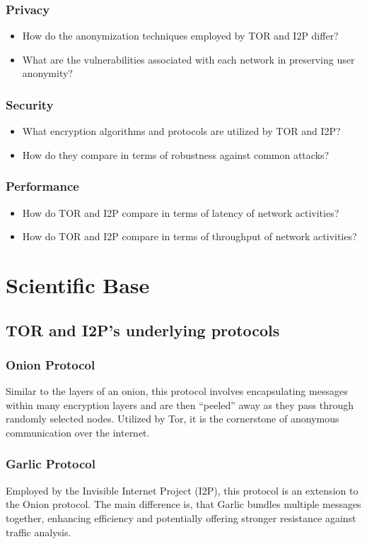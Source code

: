 \documentclass[12pt,conference]{IEEEtran}
\begin{document}
\subsubsection{Privacy}
\begin{itemize}
	\item How do the anonymization techniques employed by TOR and I2P differ?
	\item What are the vulnerabilities associated with each network in preserving user anonymity?
\end{itemize}
\subsubsection{Security} 
\begin{itemize}
	\item What encryption algorithms and protocols are utilized by TOR and I2P?
	\item How do they compare in terms of robustness against common attacks? 
\end{itemize}
\subsubsection{Performance} 
\begin{itemize}
	\item How do TOR and I2P compare in terms of latency of network activities?
	\item How do TOR and I2P compare in terms of throughput of network activities?
\end{itemize}

\section{Scientific Base}
\subsection{TOR and I2P's underlying protocols}
\subsubsection{Onion Protocol}
Similar to the layers of an onion, this protocol involves encapsulating messages within many encryption layers and are then “peeled” away as they pass through randomly selected nodes. Utilized by Tor, it is the cornerstone of anonymous communication over the internet\cite{tor}. 
\subsubsection{Garlic Protocol}
Employed by the Invisible Internet Project (I2P), this protocol is an extension to the Onion protocol. The main difference is, that Garlic bundles multiple messages together, enhancing efficiency and potentially offering stronger resistance against traffic analysis\cite{i2p}.
\end{document}
